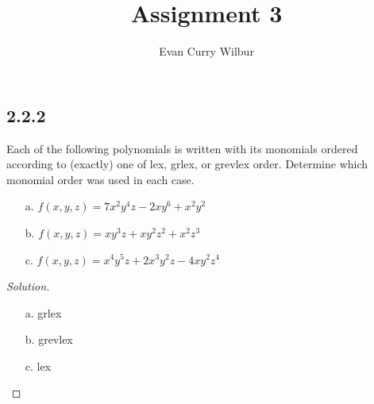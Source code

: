 \documentclass[]{article}
\title{Assignment 3}
\author{Evan Curry Wilbur}
\newcommand\<{\langle}
\renewcommand\>{\rangle}
\newenvironment{solution}
{
	\begin{proof}[Solution] \text{ }
		\\
	}
	{
	\end{proof}
}
\begin{document}
\maketitle

\subsection*{2.2.2} Each of the following polynomials is written with its monomials ordered according to (exactly) one of lex, grlex, or grevlex order. Determine which monomial order was used in each case.
\begin{enumerate}
	\item[a.] $f(x, y, z) = 7x^2y^4z - 2xy^6 + x^2y^2$
	\item[b.] $f(x, y, z) = xy^3z + xy^2z^2 + x^2z^3$
	\item[c.] $f(x, y, z) = x^4y^5z + 2x^3y^2z - 4xy^2z^4$
\end{enumerate}
\begin{solution}
	\begin{enumerate}
		\item[a.] grlex
		\item[b.] grevlex
		\item[c.] lex
	\end{enumerate}
\end{solution}
\end{document}
